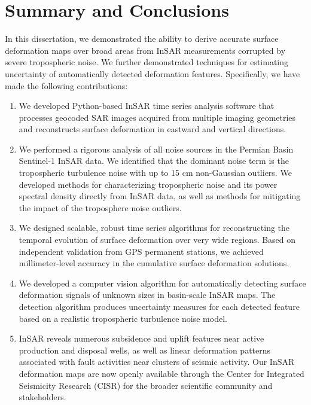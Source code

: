
\chapter{Summary and Conclusions}
\label{CHAP:7}

In this dissertation, we demonstrated the ability to derive accurate surface deformation maps over broad areas from InSAR measurements corrupted by severe tropospheric noise. We further demonstrated techniques for estimating uncertainty of automatically detected deformation features. Specifically, we have made the following contributions:


\begin{enumerate}
	\item We developed Python-based InSAR time series analysis software that processes geocoded SAR images acquired from multiple imaging geometries and reconstructs surface deformation in eastward and vertical directions.
	
	\item We performed a rigorous analysis of all noise sources in the Permian Basin Sentinel-1 InSAR data. We identified that the dominant noise term is the tropospheric turbulence noise with up to 15 cm non-Gaussian outliers. We developed methods for characterizing tropospheric noise and its power spectral density directly from InSAR data, as well as methods for mitigating the impact of the troposphere noise outliers.
	
	\item We designed scalable, robust time series algorithms for reconstructing the temporal evolution of surface deformation over very wide regions. Based on independent validation from GPS permanent stations, we achieved millimeter-level accuracy in the cumulative surface deformation solutions.
	
	\item We developed a computer vision algorithm for automatically detecting surface deformation signals of unknown sizes in basin-scale InSAR maps. The detection algorithm produces uncertainty measures for each detected feature based on a realistic tropospheric turbulence noise model.
	
	\item InSAR reveals numerous subsidence and uplift features near active production and disposal wells, as well as linear deformation patterns associated with fault activities near clusters of seismic activity. Our InSAR deformation maps are now openly available through the Center for Integrated Seismicity Research (CISR) for the broader scientific community and stakeholders. 
	
		
\end{enumerate}

